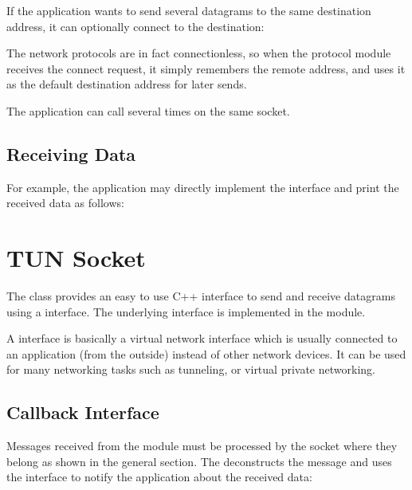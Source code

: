 If the application wants to send several datagrams to the same destination
address, it can optionally connect to the destination:


The network protocols are in fact connectionless, so when the protocol module
receives the connect request, it simply remembers the remote address, and uses
it as the default destination address for later sends.

The application can call  several times on the same socket.

\subsection*{Receiving Data}

For example, the application may directly implement the
 interface and print the received data as follows:


\section{TUN Socket}
\label{sec:sockets:tun-socket}

The  class provides an easy to use C++ interface to send and
receive datagrams using a  interface. The underlying
 interface is implemented in the  module.

A  interface is basically a virtual network interface which is
usually connected to an application (from the outside) instead of other network
devices. It can be used for many networking tasks such as tunneling, or virtual
private networking.

\subsection*{Callback Interface}

Messages received from the  module must be processed by the socket
where they belong as shown in the general section. The 
deconstructs the message and uses the  interface
to notify the application about the received data:


